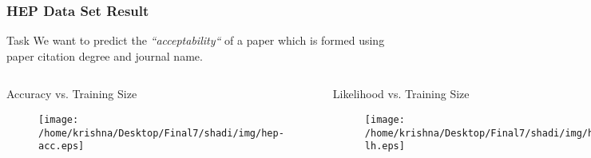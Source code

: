 \documentclass[10pt, blue,subsection=true, compress]{beamer}
\begin{document}
\begin{frame}\frametitle{HEP Data Set Result}

\begin{block}{Task}
We want to predict the \emph{``acceptability``} of a paper which is formed using paper citation degree and journal name.
\end{block}
\begin{columns}[t]

\begin{block}{Accuracy vs. Training Size}
\begin{figure}[htbp]
\centering
\texttt{[image: /home/krishna/Desktop/Final7/shadi/img/hep-acc.eps]}
\end{figure}
\end{block}


\begin{block}{Likelihood vs. Training Size}
\begin{figure}[htbp]
\centering
\texttt{[image: /home/krishna/Desktop/Final7/shadi/img/hep-lh.eps]}
\end{figure}
\end{block}
\end{columns}

\end{frame}
\end{document}
